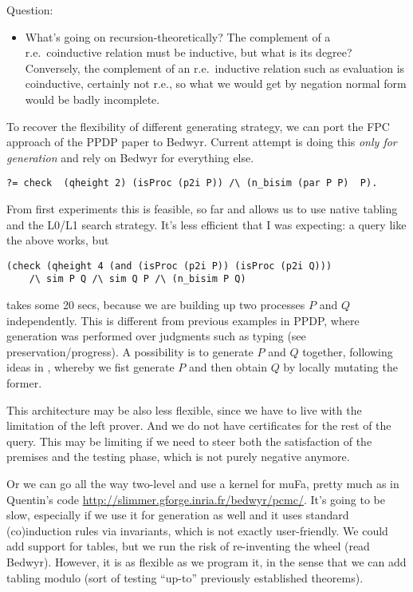 \documentclass[sigconf]{acmart}
\begin{document}
Question:
\begin{itemize}
\item What's going on recursion-theoretically? The complement of a
  r.e.\ coinductive relation must be inductive, but what is its
  degree? Conversely, the complement of an r.e.\ inductive relation
  such as evaluation is coinductive, certainly not r.e., so what we
  would get by negation normal form would be badly incomplete.
\end{itemize}

To recover the flexibility of different generating strategy, we can
port the FPC approach of the PPDP paper to Bedwyr. Current attempt is
doing this \emph{only for generation} and rely on Bedwyr for everything
else. 
\begin{lstlisting}
?= check  (qheight 2) (isProc (p2i P)) /\ (n_bisim (par P P)  P).
 \end{lstlisting}
From first experiments this is feasible, so far and allows us to use native tabling and the
L0/L1 search strategy. It's less efficient that I was expecting: a query like the above works, but
\begin{lstlisting}
(check (qheight 4 (and (isProc (p2i P)) (isProc (p2i Q)))
	/\ sim P Q /\ sim Q P /\ (n_bisim P Q)
\end{lstlisting}
takes some 20 secs, because we are building up two processes $P$ and $Q$
independently. This is different from previous examples in PPDP, where
generation was performed over judgments such as typing (see
preservation/progress). A possibility is to generate $P$ and $Q$ together, following
ideas in \cite{TNIQ}, whereby we fist generate $P$ and then obtain $Q$ by locally mutating the former.

This architecture may be also  less flexible, since we have to
live with the limitation of the left prover. And we do not have
certificates for the rest of the query. This may be limiting if we
need to steer both the satisfaction of the premises and the testing
phase, which is not purely negative anymore. 

Or we can go all the way two-level and use a kernel for muFa, pretty
much as in Quentin's code
\url{http://slimmer.gforge.inria.fr/bedwyr/pcmc/}. It's going to be
slow, especially if we use it for generation as well and it uses
standard (co)induction rules via invariants, which is not exactly
user-friendly. We could add support for tables, but we run the risk of
re-inventing the wheel (read Bedwyr). However, it is as flexible as we
program it, in the sense that we can add tabling modulo (sort of
testing ``up-to'' previously established theorems).
\end{document}
